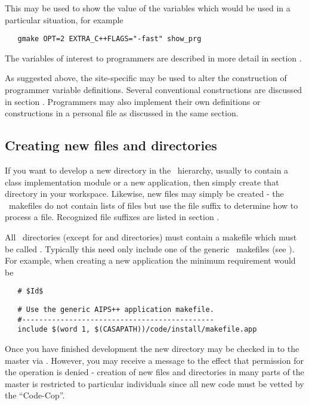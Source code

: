 \noindent
This may be used to show the value of the variables which would be used in a
particular situation, for example

\begin{verbatim}
   gmake OPT=2 EXTRA_C++FLAGS="-fast" show_prg
\end{verbatim}

\noindent
The variables of interest to programmers are described in more detail in
section .

As suggested above, the site-specific  may be used to alter
the construction of programmer variable definitions.  Several conventional
constructions are discussed in section .  Programmers may also implement their own definitions or
constructions in a personal  file as discussed in the same
section.

\subsection*{Creating new files and directories}

If you want to develop a new directory in the \aipspp\ hierarchy, usually to
contain a class implementation module or a new application, then simply create
that directory in your workspace.  Likewise, new files may simply be created -
the \aipspp\ makefiles do not contain lists of files but use the file suffix
to determine how to process a file.  Recognized file suffixes are listed in
section .

All \aipspp\ directories (except for  and 
directories) must contain a makefile which must be called .
Typically this need only include one of the generic \aipspp\ makefiles (see
).  For example, when creating a new application the minimum
requirement would be

\noindent
\verb+   # $+\verb+Id$+

\begin{verbatim}
   # Use the generic AIPS++ application makefile.
   #---------------------------------------------
   include $(word 1, $(CASAPATH))/code/install/makefile.app
\end{verbatim}

\noindent
Once you have finished development the new directory may be checked in to the
master via .  However, you may receive a message to the effect that
permission for the operation is denied - creation of new files and directories
in many parts of the master is restricted to particular individuals since all
new code must be vetted by the ``Code-Cop''.

